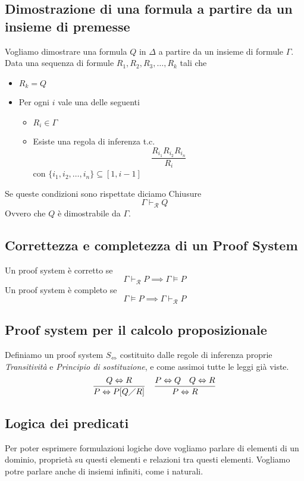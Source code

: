 \documentclass{article}
\begin{document}
\subsection*{Dimostrazione di una formula a partire da un insieme di premesse}
Vogliamo dimostrare una formula \(Q\) in \(\Delta\) a partire da un insieme di formule \(\Gamma\). \\
Data una sequenza di formule \(R_1, R_2, R_3, \ldots, R_k\) tali che
\begin{itemize}
    \item \(R_k = Q\)
    \item Per ogni \(i\) vale una delle seguenti
          \begin{itemize}
              \item \(R_i \in \Gamma\)
              \item Esiste una regola di inferenza t.c.
                    \[\frac{R_{i_1} R_{i_2} R_{i_n}}{R_i}\]
                    con \(\{i_1, i_2, \ldots, i_n\} \subseteq [1, i-1]\)
          \end{itemize}
\end{itemize}
Se queste condizioni sono rispettate diciamo Chiusure
\[\Gamma \vdash_\mathcal{R} Q\]
Ovvero che \(Q\) è dimostrabile da \(\Gamma\).
\subsection*{Correttezza e completezza di un Proof System}
Un proof system è corretto se
\[\Gamma \vdash_\mathcal{R} P \implies \Gamma \models P\]
Un proof system è completo se
\[\Gamma \models P \implies \Gamma \vdash_\mathcal{R} P\]
\subsection*{Proof system per il calcolo proposizionale}
Definiamo un proof system \(S_{\Leftrightarrow}\) costituito dalle regole di inferenza proprie \emph{Transitività} e \emph{Principio di sostituzione}, e come assimoi tutte le leggi già viste.
\begin{align*}
    \frac{Q \Leftrightarrow R}{P \Leftrightarrow P[Q \diagup R]} &  & \frac{P \Leftrightarrow Q \quad Q \Leftrightarrow R}{P \Leftrightarrow R}
\end{align*}

\subsection{Logica dei predicati}
Per poter esprimere formulazioni logiche dove vogliamo parlare di elementi di un dominio, proprietà su questi elementi e relazioni tra questi elementi. Vogliamo potre parlare anche di insiemi infiniti, come i naturali.
\end{document}
